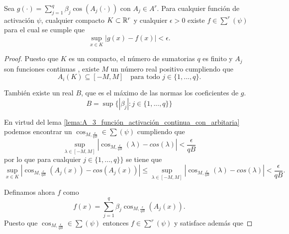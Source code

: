 \begin{lema}\label{lema:A_4_sum_cos_aproxima}
    Sea $g(\cdot) = \sum_{j=1}^q \beta_j \cos(A_j(\cdot))$ con 
    $A_j \in A^r$.
    Para cualquier función de activación $\psi$, 
    cualquier compacto $K \subset \mathbb{R}^r$
    y cualquier $\epsilon > 0$
    existe $f \in \sum^r(\psi)$ para el cual se cumple que 
    \begin{equation}
        \sup_{x \in K} 
        |g(x) - f(x)| < \epsilon.
    \end{equation}
\end{lema}
\begin{proof}
    Puesto que $K$ es un compacto, el número de sumatorias $q$
    es finito y $A_j$ son funciones continuas
    , existe
     $M$ un número real positivo  cumpliendo que
    \begin{equation}
        A_i(K) \subseteq [-M, M] 
        \quad 
        \text{para todo } j \in \{1, ..., q \}. 
    \end{equation} 

    También existe un real $B$, que es el máximo de las normas 
    los coeficientes de $g$. 
    \begin{equation}
        B = \sup \{ |\beta_j| :  j \in \{1, ..., q \}\}
    \end{equation}

    En virtud del lema \ref{lema:A_3_función_activación_continua_con_arbitaria}
    podemos encontrar un 
    $\cos_{M, \frac{\epsilon}{qB}} \in \sum(\psi)$ cumpliendo que
    \begin{equation}
        \sup_{\lambda \in [-M, M]} | 
        \cos_{M, \frac{\epsilon}{qB}}(\lambda)
        - 
        cos(\lambda)
        | 
        < \frac{\epsilon}{qB} 
    \end{equation}
    por lo que para cualquier  $j \in \{1, ..., q \}\}$   se tiene que 
    \begin{equation}
        \sup_{x \in K} | 
        \cos_{M, \frac{\epsilon}{qB}}(A_j(x))
        - 
        cos(A_j(x))
        | 
        \leq  
        \sup_{\lambda \in [-M, M]} | 
        \cos_{M, \frac{\epsilon}{qB}}(\lambda)
        - 
        cos(\lambda)
        | 
        < \frac{\epsilon}{qB}. 
    \end{equation}

    Definamos ahora $f$ como 
    \begin{equation}
        f(x) = \sum_{j=1}^q \beta_j \cos_{M, \frac{\epsilon}{qB}}(A_j(x)).
    \end{equation}
    Puesto que $\cos_{M, \frac{\epsilon}{qB}} \in \sum(\psi)$ entonces 
    $f \in \sum^r(\psi)$ y satisface además que 


\end{proof}
